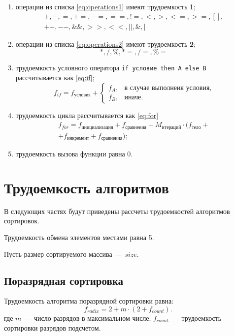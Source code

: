 \begin{enumerate}
	\item операции из списка \ref{eq:operations1} имеют трудоемкость \textbf{1};
	\begin{equation}
		\label{eq:operations1}
		\begin{gathered}
			+, -, =, +=, -=, ==, !=, <, >, <=, >=, [], \\ ++, --, \&\&, >>, <<, ||, \&, |
		\end{gathered}
	\end{equation}
	\item операции из списка \ref{eq:operations2} имеют трудоемкость \textbf{2};
	\begin{equation}
		\label{eq:operations2}
		*, /, \%, *=, /=, \%=
	\end{equation}
	\item трудоемкость условного оператора \texttt{if условие then A else B} рассчитывается как \ref{eq:if};
	\begin{equation}
		\label{eq:if}
		f_{if} = f_{\text{условия}} + 
		\begin{cases}
			f_{A}, & \text{в случае выполнеия условия,}\\
			f_{B}, & \text{иначе}.
		\end{cases}
	\end{equation}
	\item трудоемкость цикла рассчитывается как \ref{eq:for}
	\begin{equation}
		\label{eq:for}
		\begin{gathered}
			f_{for} = f_{\text{инициализация}} + f_{\text{сравнения}} + M_{\text{итераций}} \cdot (f_{\text{тело}} +\\
			+ f_{\text{инкремент}} + f_{\text{сравнения}});
		\end{gathered}
	\end{equation}
	\item трудоемкость вызова функции равна 0.
\end{enumerate}

\section{Трудоемкость алгоритмов}
В следующих частях будут приведены рассчеты трудоемкостей алгоритмов сортировок.

Трудоемкость обмена элементов местами равна 5.

Пусть размер сортируемого массива~--- $size$.

\subsection*{Поразрядная сортировка}
Трудоемкость алгоритма поразрядной сортировки равна:
\begin{equation}
	f_{radix} = 2 + m \cdot (2 + f_{count}).
\end{equation}
где $m$~--- число разрядов в максимальном числе;
$f_{count}$~--- трудоемкость сортировки разрядов подсчетом.

